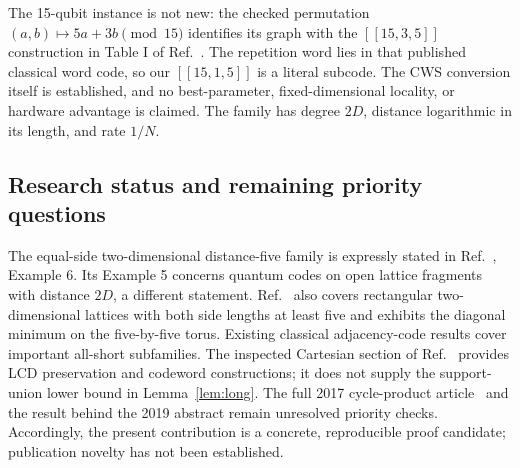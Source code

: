 The 15-qubit instance is not new: the checked permutation $(a,b)\mapsto5a+3b\pmod {15}$ identifies its graph with the $[[15,3,5]]$ construction in Table I of Ref.~\cite{kovalev2011}. The repetition word lies in that published classical word code, so our $[[15,1,5]]$ is a literal subcode. The CWS conversion itself is established, and no best-parameter, fixed-dimensional locality, or hardware advantage is claimed. The family has degree $2D$, distance logarithmic in its length, and rate $1/N$.

\subsection*{Research status and remaining priority questions}
The equal-side two-dimensional distance-five family is expressly stated in Ref.~\cite{kovalev2011}, Example 6. Its Example 5 concerns quantum codes on open lattice fragments with distance $2D$, a different statement. Ref.~\cite{sudevan2022} also covers rectangular two-dimensional lattices with both side lengths at least five and exhibits the diagonal minimum on the five-by-five torus. Existing classical adjacency-code results cover important all-short subfamilies. The inspected Cartesian section of Ref.~\cite{fishlcd} provides LCD preservation and codeword constructions; it does not supply the support-union lower bound in Lemma~\ref{lem:long}. The full 2017 cycle-product article~\cite{fishcycles} and the result behind the 2019 abstract remain unresolved priority checks. Accordingly, the present contribution is a concrete, reproducible proof candidate; publication novelty has not been established.
